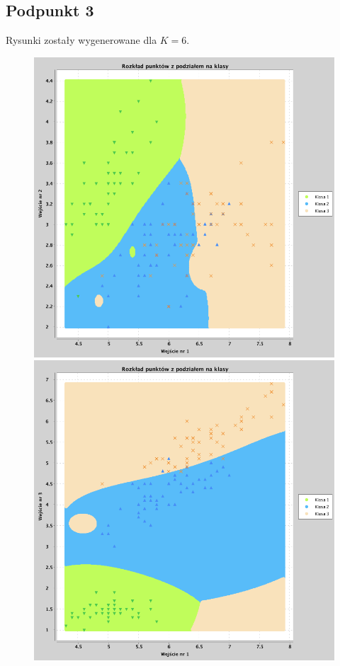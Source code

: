 \documentclass[a4paper, portrait,11pt]{article}
\begin{document}
\subsection{Podpunkt 3}
Rysunki zostały wygenerowane dla $K=6$.
\begin{figure}[!htb]
  \begin{minipage}{0.33\textwidth}
    \centering
    \includegraphics[width=1\linewidth]{../data/classification4/3/derivatives/2_1,2.png}
    \caption{\label{fig:43_2_1,2derivative}}
  \end{minipage}
  \begin{minipage}{0.33\textwidth}
    \centering
    \includegraphics[width=1\linewidth]{../data/classification4/3/derivatives/2_1,3.png}

\end{minipage}
\end{figure}
\end{document}
